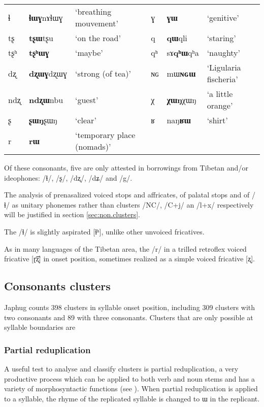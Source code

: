 \documentclass[oldfontcommands,oneside,a4paper,11pt]{article}
\newcommand{\ipa}[1]{{\phon #1}} %
\begin{document}
\begin{table}
{\begin{tabular}{lll|lll}
ɬ   & 	  \ipa{\textbf{ɬɯɣ}nɤɬɯɣ}   & 	 `breathing mouvement' & 	ɣ & 	\ipa{\textbf{ɣɯ}}   & 	 `genitive' \\ 
tʂ   & 	  \ipa{\textbf{tʂɯ}tʂu}   & 	 `on the road' & 	q & 	\ipa{\textbf{qɯ}qli}   & 	 `staring' \\ 
tʂʰ   & 	  \ipa{\textbf{tʂʰɯɣ}}   & 	 `maybe' & 	qʰ & 	\ipa{sɤ\textbf{qʰɯ}qʰa}   & 	 `naughty' \\ 
dʐ   & 	\ipa{\textbf{dʐɯɣ}dʐɯɣ}   & 	 `strong (of tea)' & 	ɴɢ & 	\ipa{mɯ\textbf{ɴɢɯ}}  & 	 `Ligularia fischeria' \\ 
ndʐ & 	\ipa{\textbf{ndʐɯ}nbu}   & 	 `guest' & 	χ & 	\ipa{\textbf{χɯŋ}χɯŋ}   & 	 `a little orange' \\ 
ʂ & 	\ipa{\textbf{ʂɯŋ}ʂɯŋ}   & 	 `clear' & 	ʁ & 	\ipa{naŋ\textbf{ʁɯ}}   & 	 `shirt' \\ 
r & 	\ipa{\textbf{rɯ}}   & 	 `temporary place (nomads)' & 	  & 	 & 	 \\ 
\bottomrule
\end{tabular}}
\end{table}

Of these consonants, five are only attested in borrowings from Tibetan and/or ideophones: /ɬ/, /ʂ/, /dʐ/, /dʑ/ and /g/.

The analysis of prenasalized voiced stops and affricates, of palatal stops and of /ɬ/ as unitary phonemes rather than clusters /NC/, /C+j/ an /l+x/ respectively will be justified in section \ref{sec:non.clusters}. 

The /ɬ/ is slightly aspirated [ɬʰ], unlike other unvoiced fricatives.


As in many languages of the Tibetan area, the /r/ in a trilled retroflex voiced fricative [ɽ͡ʐ] in onset position, sometimes realized as a simple voiced fricative [ʐ].


  \subsection{Consonants clusters} \label{sec:clusters}
  Japhug counts 398 clusters in syllable onset position, including  309 clusters with two consonants and 89 with three consonants. Clusters that are only possible at syllable boundaries are
  
  \subsubsection{Partial reduplication} \label{sec:redp}
 A useful test to analyse and classify clusters is partial reduplication, a very productive process which can be applied to both verb and noun stems and has a variety of morphosyntactic functions (see \citealt{jacques07redupl}). When partial reduplication is applied to a syllable, the rhyme of the replicated syllable is changed to \ipa{ɯ} in the replicant.
 
\end{document}
